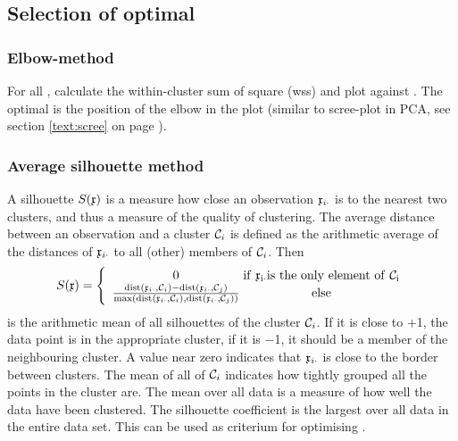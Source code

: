 \begin{refsection}
\subsection{Selection of optimal }

\subsubsection{Elbow-method}

For all , calculate the within-cluster sum of square (wss) and plot against . The optimal  is the position of the elbow in the plot (similar to scree-plot in \acs{PCA}, see section \ref{text:scree} on page \pageref{text:scree}).

\subsubsection{Average silhouette method}

A silhouette \( S(\mathfrak{x}) \) is a measure how close an observation \( \mathfrak{x}_{i\cdot} \) is to the nearest two clusters, and thus a measure of the quality of clustering. The average distance between an observation and a cluster \( \mathcal{C}_i \) is defined as the arithmetic average of the distances of \( \mathfrak{x}_{i\cdot} \) to all (other) members of \( \mathcal{C}_i \). Then
\begin{equation}
  S(\AbsVec{x}) = \left\{
                    \begin{array}{c@{\;}c}
                       0 & \mathrm{if\ \AbsVec{x}_{i\cdot} is\ the\ only\ element\ of\ \arr{C}_i} \\
                       \frac{\dist(\AbsVec{x}_{i\cdot}, \arr{C}_i)-\dist(\AbsVec{x}_{i\cdot}, \arr{C}_j)}{\max(\dist(\AbsVec{x}_{i\cdot}, \arr{C}_i), \dist(\AbsVec{x}_{i\cdot}, \arr{C}_j))} & \mathrm{else}
                    \end{array}
                 \right.
\end{equation}
 is the arithmetic mean of all silhouettes of the  cluster \( \mathcal{C}_i \). If it is close to +1, the data point is in the appropriate cluster, if it is \num{-1}, it should be a member of the neighbouring cluster. A value near zero indicates that \( \mathfrak{x}_{i\cdot} \) is close to the border between clusters. The mean of all  of \( \mathcal{C}_i \) indicates how tightly grouped all the points in the cluster are. The mean  over all data is a measure of how well the data have been clustered. The silhouette coefficient is the largest  over all data in the entire data set. This can be used as criterium for optimising .


\end{refsection}
